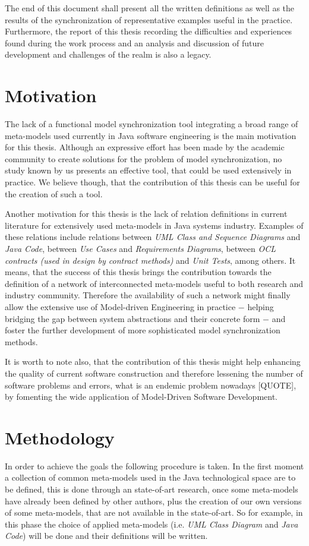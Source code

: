 \documentclass[tuberlin,cic,tc,openright,english,noabntcite]{iiufrgs}
\begin{document}
The end of this document shall present all the written definitions as well as the results of the synchronization of representative examples useful in the practice. Furthermore, the report of this thesis recording the difficulties and experiences found during the work process and an analysis and discussion of future development and challenges of the realm is also a legacy.

\section{Motivation}
The lack of a functional model synchronization tool integrating a broad range of meta-models used currently in Java software engineering is the main motivation for this thesis. Although an expressive effort has been made by the academic community to create solutions for the problem of model synchronization, no study known by us presents an effective tool, that could be used extensively in practice. We believe though, that the contribution of this thesis can be useful for the creation of such a tool.
	
Another motivation for this thesis is the lack of relation definitions in current literature for extensively used meta-models in Java systems industry. Examples of these relations include relations between \emph{UML Class and Sequence Diagrams} and \emph{Java Code}, between \emph{Use Cases} and \emph{Requirements Diagrams}, between \emph{OCL contracts (used in design by contract methods)} and \emph{Unit Tests}, among others. It means, that the success of this thesis brings the contribution towards the definition of a network of interconnected meta-models useful to both research and industry community. Therefore the availability of such a network might finally allow the extensive use of Model-driven Engineering in practice $-$ helping bridging the gap between system abstractions and their concrete form $-$ and foster the further development of more sophisticated model synchronization methods.

It is worth to note also, that the contribution of this thesis might help enhancing the quality of current software construction and therefore lessening the number of software problems and errors, what is an endemic problem nowadays [QUOTE], by fomenting the wide application of Model-Driven Software Development.

\section{Methodology}
In order to achieve the goals the following procedure is taken. In the first moment a collection of common meta-models used in the Java technological space are to be defined, this is done through an state-of-art research, once some meta-models have already been defined by other authors, plus the creation of our own versions of some meta-models, that are not available in the state-of-art. So for example, in this phase the choice of applied meta-models (i.e. \emph{UML Class Diagram} and \emph{Java Code}) will be done and their definitions will be written.
\end{document}
